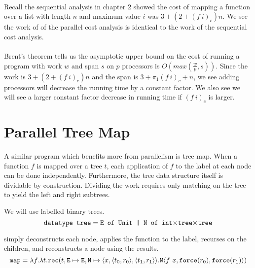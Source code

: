 \paragraph{}
Recall the sequential  analysis in chapter 2 showed the cost of
mapping a function  over a list  with length $n$ and maximum value
$i$ was $3 + (2 + (f\ i)_c)n$. We see the work of of the parallel cost analysis
is identical to the work of the sequential cost analysis.

\paragraph{}
Brent's theorem tells us the asymptotic upper bound on the cost of running a
program with work $w$ and span $s$ on $p$ processors is $O(max(\frac{w}{p},
s))$. Since the work is $3 + (2 + (f\ i)_c)n$ and the span is $3 + \pi_1(f\
i)_c + n$, we see adding processors will decrease the running time by a
constant factor. We also see we will see a larger constant factor decrease in
running time if $(f\ i)_c$ is larger.


\section{Parallel Tree Map}

\paragraph{}
A similar program which benefits more from parallelism is tree map.  When a
function $f$ is mapped over a tree $t$, each application of $f$ to the label at
each node can be done independently.  Furthermore, the tree data structure
itself is dividable by construction.  Dividing the work requires only
matching on the tree to yield the left and right subtrees.

We will use  labelled binary trees.
%
\begin{equation*}
  \texttt{datatype tree} = \texttt{E of Unit | N of int$\times$tree$\times$tree}
\end{equation*}

%
 simply deconstructs each node, applies the function to the label,
recurses on the children, and reconstructs a node using the results.
%
\begin{equation*}
  \texttt{map} = \lambda f.\lambda t.\texttt{rec}(t, \texttt{E} \mapsto \texttt{E}, \texttt{N} \mapsto \langle x, \langle t_0, r_0 \rangle, \langle t_1, r_1 \rangle\rangle.\texttt{N} \langle f\ x, \texttt{force}(r_0), \texttt{force}(r_1)\rangle)
\end{equation*}
%
